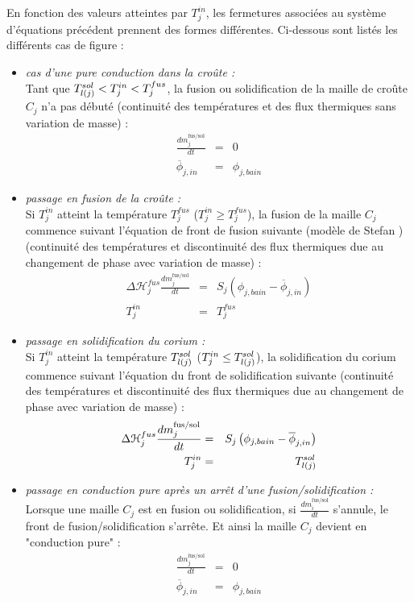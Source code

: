 En fonction des valeurs atteintes par $T_j^{in}$, les fermetures associées au système d'équations précédent prennent des formes différentes. Ci-dessous sont listés les différents cas de figure :\\

\begin{itemize}
\item {\it cas d'une pure conduction dans la croûte :}\\
Tant que $\temperature[sol]{l(j)}<T_j^{in}<T_j^{fus}$, la fusion ou solidification de la maille de croûte $C_j$ n'a pas débuté (continuité des températures et des flux thermiques sans variation de masse) :
\begin{eqnarray*}
\frac{dm_j^\text{fus/sol}}{dt} &=& 0 \\
\overline{\phi}_{j,in} &=& \phi_{j,bain}
\end{eqnarray*}

\item {\it passage en fusion de la croûte :}\\
Si $T_j^{in}$ atteint la température $T_j^{fus}$ ($T_j^{in}\ge T_j^{fus}$), la fusion de la maille $C_j$ commence suivant l'équation de front de fusion suivante (modèle de Stefan \cite{LeTellier2016}) (continuité des températures et discontinuité des flux thermiques due au changement de phase avec variation de masse) :
\begin{eqnarray*}
\Delta \mathcal{H}_j^{fus} \frac{dm_j^\text{fus/sol}}{dt} &=& S_j\left(\phi_{j,bain} - \overline{\phi}_{j,in}\right) \\
T_j^{in} &=& T_j^{fus}
\end{eqnarray*}

\item {\it passage en solidification du corium :}\\
Si $T_j^{in}$ atteint la température $\temperature[sol]{l(j)}$ ($T_j^{in}\le \temperature[sol]{l(j)}$), la solidification du corium commence suivant l'équation du front de solidification suivante (continuité des températures et discontinuité des flux thermiques due au changement de phase avec variation de masse) :
\begin{eqnarray*}
\Delta \mathcal{H}_j^{fus} \frac{dm_j^\text{fus/sol}}{dt} &=& S_j\left(\phi_{j,bain} - \overline{\phi}_{j,in}\right) \\
T_j^{in} &=& \temperature[sol]{l(j)}
\end{eqnarray*}

\item {\it passage en conduction pure après un arrêt d'une fusion/solidification :}\\
Lorsque une maille $C_j$ est en fusion ou solidification, si $\frac{dm_i^\text{fus/sol}}{dt}$ s'annule, le front de fusion/solidification s'arrête. Et ainsi la maille $C_j$ devient en "conduction pure" :
\begin{eqnarray*}
\frac{dm_j^\text{fus/sol}}{dt} &=& 0 \\
\overline{\phi}_{j,in} &=& \phi_{j,bain}
\end{eqnarray*}
\end{itemize}


